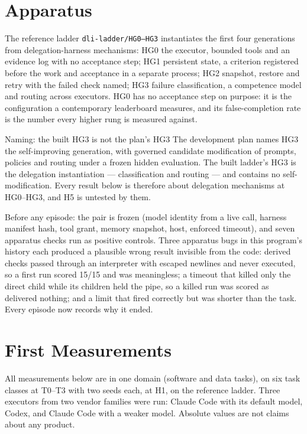 \documentclass[11pt]{article}
\theoremstyle{definition}
\begin{document}
\section{Apparatus}\label{sec:apparatus}

The reference ladder \texttt{dli-ladder/HG0--HG3} instantiates the first four generations from delegation-harness mechanisms: HG0 the executor, bounded tools and an evidence log with no acceptance step; HG1 persistent state, a criterion registered before the work and acceptance in a separate process; HG2 snapshot, restore and retry with the failed check named; HG3 failure classification, a competence model and routing across executors. HG0 has no acceptance step on purpose: it is the configuration a contemporary leaderboard measures, and its false-completion rate is the number every higher rung is measured against.

\begin{cautionbox}{Naming: the built HG3 is not the plan's HG3}
The development plan names HG3 the self-improving generation, with governed candidate modification of prompts, policies and routing under a frozen hidden evaluation. The built ladder's HG3 is the delegation instantiation --- classification and routing --- and contains no self-modification. Every result below is therefore about delegation mechanisms at HG0--HG3, and H5 is untested by them.
\end{cautionbox}

Before any episode: the pair is frozen (model identity from a live call, harness manifest hash, tool grant, memory snapshot, host, enforced timeout), and seven apparatus checks run as positive controls. Three apparatus bugs in this program's history each produced a plausible wrong result invisible from the code: derived checks passed through an interpreter with escaped newlines and never executed, so a first run scored 15/15 and was meaningless; a timeout that killed only the direct child while its children held the pipe, so a killed run was scored as delivered nothing; and a limit that fired correctly but was shorter than the task. Every episode now records why it ended.

\section{First Measurements}\label{sec:results}

All measurements below are in one domain (software and data tasks), on six task classes at T0--T3 with two seeds each, at H1, on the reference ladder. Three executors from two vendor families were run: Claude Code with its default model, Codex, and Claude Code with a weaker model. Absolute values are not claims about any product.
\end{document}
